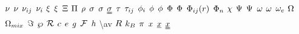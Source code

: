 \begin{mdframed}
$\freq$ \newline
$\kinvisc$ \newline
$\stoich$ \newline
$\chargeval$ \newline
$\conjcoortwo$ \newline
$\extent$ \newline
$\gcpf$ \newline
$\osmpress$ \newline
$\dens$ \newline
$\symfac$ \newline
$\molecrad$ \newline
$\stresstens$ \newline
$\torque$ \newline
$\shear$ \newline
$\fhmolefrac{i}$ \newline
$\fugcoeff$ \newline
$\eleccoeff$ \newline
$\pot$ \newline
$\diss$ \newline
$\potfunc$ \newline
$\fftbasis$ \newline
$\fhparam$ \newline
$\streamfunc$ \newline
$\dlesselecpot$ \newline
$\mpf$ \newline
$\accentfac$ \newline
$\elecdegen$ \newline
$\mpc$ \newline
$\combmixfunc$ \newline
$\dof$ \newline
$\dynpress$ \newline
$\surfreac$ \newline
$\lightspeed$ \newline
$\e$ \newline
$\grav$ \newline
$\faraday$ \newline
$\planck$ \newline
  \textbackslash av \newline
$\gasconst$ \newline
$\boltz$ \newline
$\pie$ \newline
$\exscal$ \newline
$\exvecone$ \newline
$\exvectwo$ \newline

\end{mdframed}
